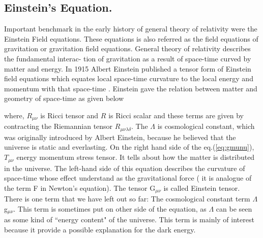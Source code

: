 \documentclass[12pt]{report}
\begin{document}
\subsection{Einstein's Equation.}
Important benchmark in the early history of general theory of relativity were the Einstein Field equations. These equations is also referred as the field equations of gravitation or gravitation field equations. General theory of relativity describes the fundamental interac- tion of gravitation as a result of space-time curved by matter and energy. In 1915 Albert Einstein published a tensor form of Einstein field equations which equates local space-time curvature to the local energy and momentum with that space-time \cite{ae1915}.
Einstein gave the relation between matter and geometry of space-time as given below
where, $R_{\mu\nu}$ is Ricci tensor and $R$ is Ricci scalar and these terms are given by contracting the Riemannian tensor $R_{\mu\nu\lambda\delta}$. The $\Lambda$ is cosmological constant, which was originally introduced by Albert Einstein, because he believed that the universe is static and everlasting. On the right hand side of the eq.(\ref{eq:gmunu}), $T_{\mu\nu}$  energy momentum stress tensor. It tells about how the matter is distributed in the universe. The left-hand side of this equation describes the curvature of space-time whose effect understand as the gravitational force ( it is analogue of the term F in Newton's equation). The tensor G$_{\mu\nu}$ is called Einstein tensor.  \\
There is one term that we have left out so far: The cosmological constant term $\Lambda$g$_{\mu\nu}$. This term is sometimes put on other side of the equation, as $\Lambda$ can be seen as some kind of ``energy content" of the universe. This term is mainly of interest because it provide a possible explanation for the dark energy\cite{ag1998,sp1998}.   \\
\end{document}
